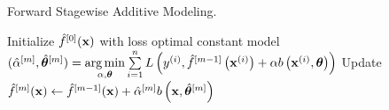 \begin{algorithm}[H]
  \begin{footnotesize}
  \begin{center}
	\caption{Forward Stagewise Additive Modeling.}
    \begin{algorithmic}[1]
      \State Initialize $\hat{f}^{[0]}(\mathbf{x})$ with loss optimal constant model%
        \State $(\hat{\alpha}^{[m]}, \hat{\bm{\theta}}^{[m]}) = \operatorname*{arg\,min} \limits_{\alpha, \bm{\theta}} \sum \limits_{i=1}^n
                 L\left(y^{(i)}, \hat{f}^{[m-1]}\left(\mathbf{x}^{(i)}\right) + \alpha b\left(\mathbf{x}^{(i)}, \bm{\theta}\right)\right)$
        \vspace{1.5ex}
        \State Update $\hat{f}^{[m]}(\mathbf{x}) \gets \hat{f}^{[m-1]}(\mathbf{x}) + \hat{\alpha}^{[m]} b\left(\mathbf{x}, \hat{\bm{\theta}}^{[m]}\right)$
      \EndFor
    \end{algorithmic}
    \end{center}
    \end{footnotesize}
\end{algorithm}
